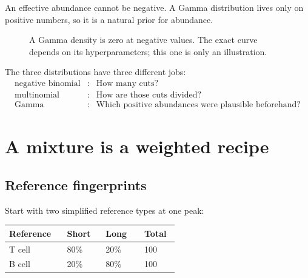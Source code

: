 \documentclass[11pt]{article}
\begin{document}
An effective abundance cannot be negative. A Gamma distribution lives only on
positive numbers, so it is a natural prior for abundance.

\begin{figure}[H]
\centering
{}
\caption{A Gamma density is zero at negative values. The exact curve depends on its hyperparameters; this one is only an illustration.}
\end{figure}

\begin{bigidea}
The three distributions have three different jobs:
\[
\boxed{
\begin{array}{rcl}
\text{negative binomial} &:& \text{How many cuts?}\\
\text{multinomial} &:& \text{How are those cuts divided?}\\
\text{Gamma} &:& \text{Which positive abundances were plausible beforehand?}
\end{array}}
\]
\end{bigidea}

\section{A mixture is a weighted recipe}

\subsection{Reference fingerprints}

Start with two simplified reference types at one peak:

\begin{center}
\begin{tabular}{L{0.30\linewidth}C{0.20\linewidth}C{0.20\linewidth}C{0.18\linewidth}}
\toprule
Reference & Short & Long & Total \\
\midrule
T cell & 80\% & 20\% & 100 \\
B cell & 20\% & 80\% & 100 \\
\bottomrule
\end{tabular}
\end{center}
\end{document}

